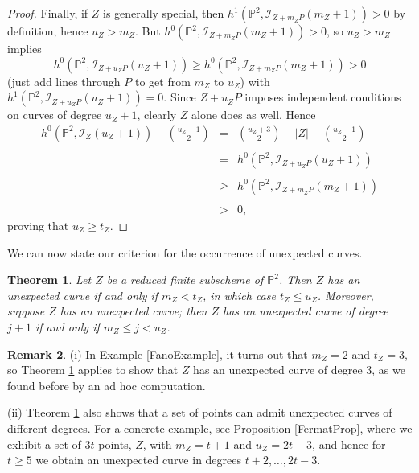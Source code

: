\documentclass[12pt]{amsart}
\numberwithin{equation}{section}
\newtheorem{theorem}{Theorem}[section]
\theoremstyle{definition}
\newtheorem{remark}[theorem]{Remark}
\begin{document}
\begin{proof}
Finally, if $Z$ is generally special, then $h^1({ \ensuremath{\mathbb{P}}}^2,\mathcal I_{Z+m_ZP}(m_Z+1))>0$ by definition,
hence $u_Z > m_Z$. But $h^0({ \ensuremath{\mathbb{P}}}^2,\mathcal I_{Z+m_ZP}(m_Z+1))>0$, so $u_Z> m_Z$
implies 
\[
h^0({ \ensuremath{\mathbb{P}}}^2,\mathcal I_{Z+u_ZP}(u_Z+1)) \geq h^0({ \ensuremath{\mathbb{P}}}^2,\mathcal I_{Z+m_ZP}(m_Z+1))>0 
\]
(just add lines through $P$ to get from $m_Z$ to $u_Z$) with $h^1({ \ensuremath{\mathbb{P}}}^2,\mathcal I_{Z+u_ZP}(u_Z+1))=0$. Since $Z + u_Z P$ imposes independent conditions on curves of degree $u_Z+1$, clearly $Z$ alone does as well. Hence
\[
\begin{array}{rcl}
h^0({ \ensuremath{\mathbb{P}}}^2,\mathcal I_Z(u_Z+1))-\binom{u_Z+1}{2} & = & \binom{u_Z+3}{2} - |Z| - \binom{u_Z+1}{2} \\ \\
& = & h^0({ \ensuremath{\mathbb{P}}}^2,\mathcal I_{Z+u_Z P} (u_Z+1)) \\ \\
& \geq & h^0({ \ensuremath{\mathbb{P}}}^2,\mathcal I_{Z+m_Z P} (m_Z+1)) \\ \\
& > & 0,
\end{array}
\]
proving that $u_Z \geq t_Z$.
\end{proof}

We can now state our criterion for the occurrence of unexpected curves.

\begin{theorem}\label{u_ZTheorem}
Let $Z$ be a reduced finite subscheme of ${ \ensuremath{\mathbb{P}}}^2$. Then $Z$ has an unexpected curve if and only if $m_Z < t_Z$,
in which case $t_Z \leq  u_Z$. Moreover, suppose $Z$ has an unexpected curve; then $Z$ has an unexpected 
curve of degree $j+1$ if and only if $m_Z \leq j < u_Z$.
\end{theorem}

\begin{remark}
(i) In Example \ref{FanoExample}, it turns out that $m_Z=2$ and $t_Z=3$,
so Theorem \ref{u_ZTheorem} applies to show that $Z$ has an unexpected curve of degree 3,
as we found before by an ad hoc computation.

(ii) Theorem \ref{u_ZTheorem} also shows that a set of points can admit unexpected curves of different degrees.  For a concrete example, see Proposition \ref{FermatProp}, where we exhibit a set of $3t$ points, $Z$, with $m_Z = t+1$ and $u_Z = 2t -3$, and hence for $t \geq 5$ we obtain an unexpected curve in degrees $t+2,\dots,2t-3$.
\end{remark}
\end{document}
